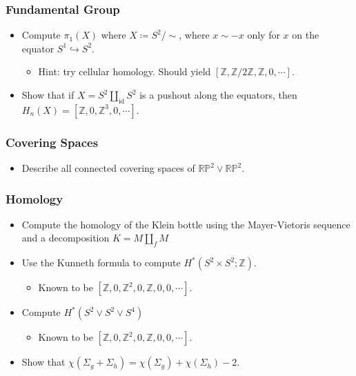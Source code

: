 \hypertarget{fundamental-group}{%
\subsubsection{Fundamental Group}\label{fundamental-group}}

\begin{itemize}
\tightlist
\item
  Compute \(\pi_1(X)\) where \(X \coloneqq S^2/\sim\), where
  \(x\sim -x\) only for \(x\) on the equator
  \(S^1 \hookrightarrow S^2\).

  \begin{itemize}
  \tightlist
  \item
    Hint: try cellular homology. Should yield
    \([{\mathbb{Z}}, {\mathbb{Z}}/2{\mathbb{Z}}, {\mathbb{Z}}, 0, \cdots]\).
  \end{itemize}
\item
  Show that if \(X = S^2 {\coprod}_{\operatorname{id}} S^2\) is a
  pushout along the equators, then
  \(H_n(X) = [{\mathbb{Z}}, 0, {\mathbb{Z}}^3, 0, \cdots]\).
\end{itemize}

\hypertarget{covering-spaces-1}{%
\subsubsection{Covering Spaces}\label{covering-spaces-1}}

\begin{itemize}
\tightlist
\item
  Describe all connected covering spaces of
  \({\mathbb{RP}}^2 \vee {\mathbb{RP}}^2\).
\end{itemize}

\hypertarget{homology}{%
\subsubsection{Homology}\label{homology}}

\begin{itemize}
\tightlist
\item
  Compute the homology of the Klein bottle using the Mayer-Vietoris
  sequence and a decomposition \(K = M {\coprod}_f M\)
\item
  Use the Kunneth formula to compute
  \(H^*(S^2\times S^2; {\mathbb{Z}})\).

  \begin{itemize}
  \tightlist
  \item
    Known to be
    \([{\mathbb{Z}}, 0, {\mathbb{Z}}^2, 0, {\mathbb{Z}}, 0, 0, \cdots]\).
  \end{itemize}
\item
  Compute \(H^*(S^2 \vee S^2 \vee S^4)\)

  \begin{itemize}
  \tightlist
  \item
    Known to be
    \([{\mathbb{Z}}, 0, {\mathbb{Z}}^2, 0, {\mathbb{Z}}, 0, 0, \cdots]\).
  \end{itemize}
\item
  Show that
  \(\chi(\Sigma_g + \Sigma_h) = \chi(\Sigma_g) + \chi(\Sigma_h) - 2\).
\end{itemize}


\printbibliography[title=Bibliography]




